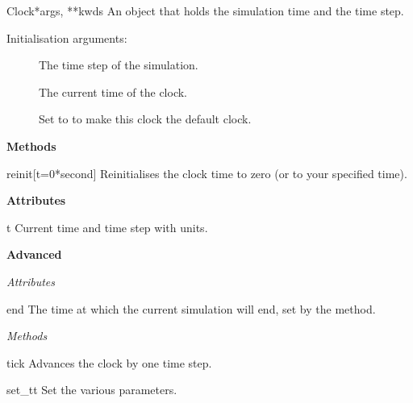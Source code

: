 \documentclass[letterpaper,10pt,english]{manual}
\begin{document}
\hypertarget{brian.Clock}{}\begin{classdesc}{Clock}{*args, **kwds}
An object that holds the simulation time and the time step.

Initialisation arguments:
\begin{description}
\item[]
The time step of the simulation.

\item[]
The current time of the clock.

\item[]
Set to  to make this clock the default clock.

\end{description}

\textbf{Methods}

\hypertarget{brian.Clock.reinit}{}\begin{methoddesc}{reinit}{{[}t=0*second{]}}
Reinitialises the clock time to zero (or to your
specified time).
\end{methoddesc}

\textbf{Attributes}

\hypertarget{brian.Clock.t}{}\begin{memberdesc}{t}
\hypertarget{brian.Clock.dt}{}
Current time and time step with units.
\end{memberdesc}

\textbf{Advanced}

\emph{Attributes}

\hypertarget{brian.Clock.end}{}\begin{memberdesc}{end}
The time at which the current simulation will end,
set by the  method.
\end{memberdesc}

\emph{Methods}

\hypertarget{brian.Clock.tick}{}\begin{methoddesc}{tick}{}
Advances the clock by one time step.
\end{methoddesc}

\hypertarget{brian.Clock.set_t}{}\begin{methoddesc}{set\_t}{t}
\hypertarget{brian.Clock.set_dt}{}
\hypertarget{brian.Clock.set_end}{}
Set the various parameters.
\end{methoddesc}


\end{classdesc}
\end{document}
